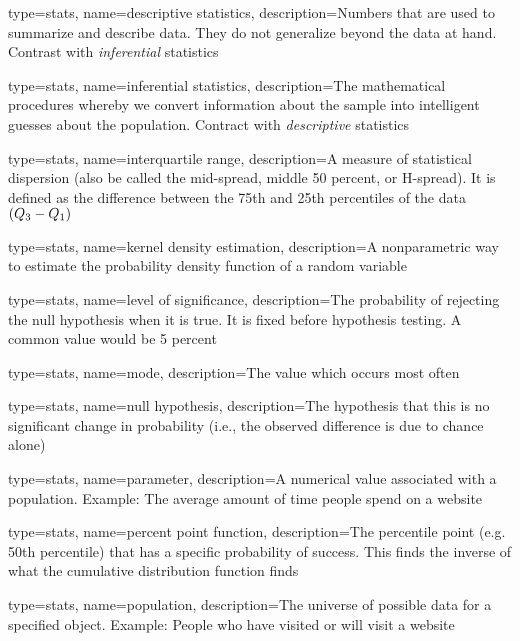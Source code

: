 {
	type=stats,
	name=descriptive statistics,
	description={Numbers that are used to summarize and describe data.  They do not generalize beyond the data at hand.  Contrast with \textit{inferential} statistics}
}

{
	type=stats,
	name=inferential statistics,
	description={The mathematical procedures whereby we convert information about the sample into intelligent guesses about the population.  Contract with \textit{descriptive} statistics}
}

{
	type=stats,
	name=interquartile range,
	description={A measure of statistical dispersion (also be called the mid-spread, middle 50 percent, or H-spread).  It is defined as the difference between the 75th and 25th percentiles of the data $\left(\mbox{$Q_{3}$}{}-\mbox{$Q_{1}$}{}\right)$}
}

{
	type=stats,
	name=kernel density estimation,
	description={A non\-parametric way to estimate the probability density function of a random variable}
}

{
	type=stats,
	name=level of significance,
	description={The probability of rejecting the null hypothesis when it is true.  It is fixed before hypothesis testing.  A common value would be 5 percent}
}

{
	type=stats,
	name=mode,
	description={The value which occurs most often}
}

{
	type=stats,
	name=null hypothesis,
	description={The hypothesis that this is no significant change in probability (i.e., the observed difference is due to chance alone)}
}

{
	type=stats,
	name=parameter,
	description={A numerical value associated with a population. Example: The average amount of time people spend on a website}
}

{
	type=stats,
	name=percent point function,
	description={The percentile point (e.g. 50th percentile) that has a specific probability of success.  This finds the inverse of what the cumulative distribution function finds}
}

{
	type=stats,
	name=population,
	description={The universe of possible data for a specified object. Example: People who have visited or will visit a website}
}

